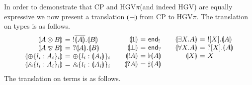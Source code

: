 \documentclass{easychair}
\makeatletter
\newcommand{\ba}{\begin{array}}
\newcommand{\ea}{\end{array}}
\newenvironment{eqs}{\ba{@{}r@{~}c@{~}l@{}}}{\ea}
\newcommand{\key}{\mathsf}
\newcommand{\set}[1]{\{ #1 \}}
\newcommand{\cptogv}[1]{\llparenthesis{#1}\rrparenthesis}
\newcommand{\row}[2]{\set{#1}_{#2}}
\newcommand{\gvOutput}[2]{\mathord{!}{#1}.{#2}}
\newcommand{\gvInput}[2]{\mathord{?}{#1}.{#2}}
\newcommand{\gvEndOutput}{\key{end}_!}
\newcommand{\gvEndInput}{\key{end}_?}
\newcommand{\gvPlus}[2]{\oplus \row{#1}{#2}}
\newcommand{\gvChoice}[2]{\binampersand \row{#1}{#2}}
\newcommand{\gvServer}[1]{\flat {#1}}
\newcommand{\gvService}[1]{\sharp {#1}}
\newcommand{\gvDual}[1]{\overline{#1}}
\newcommand{\gvOutputType}[2]{![{#1}].{#2}}
\newcommand{\gvInputType}[2]{?[{#1}].{#2}}
\newcommand{\la}{l}
\newcommand{\cpTimes}[2]{{#1} \otimes {#2}}
\newcommand{\cpPar}[2]{{#1} \mathbin{\bindnasrepma} {#2}}
\newcommand{\cpPlus}[2]{\oplus \row{#1}{#2}}
\newcommand{\cpWith}[2]{\binampersand \row{#1}{#2}}
\newcommand{\cpOne}{1}
\newcommand{\cpBottom}{\bot}
\newcommand{\cpOfCourse}[1]{!{#1}}
\newcommand{\cpWhyNot}[1]{?{#1}}
\newcommand{\cpExists}[2]{\exists {#1}.{#2}}
\newcommand{\cpForall}[2]{\forall {#1}.{#2}}
\newcommand{\hgv}{HGV\xspace}
\newcommand{\hgvpi}{HGV$\pi$\xspace}
\makeatother
\begin{document}
In order to demonstrate that CP and \hgvpi (and indeed \hgv) are equally expressive we now present a
translation $\cptogv{-}$ from CP to \hgvpi. The translation on types is as follows.
\[
\ba{@{}c@{\qquad}c@{\qquad}c@{}}
\begin{eqs}
\cptogv{\cpTimes{A}{B}} &=& \gvOutput{\gvDual{\cptogv{A}}}{\cptogv{B}} \\
\cptogv{\cpPar{A}{B}}   &=& \gvInput{\cptogv{A}}{\cptogv{B}} \\
\cptogv{\cpPlus{\la_i:A_i}{i}} &=& \gvPlus{\la_i:\cptogv{A_i}}{i}  \\
\cptogv{\cpWith{\la_i:A_i}{i}} &=& \gvChoice{\la_i:\cptogv{A_i}}{i} \\
\end{eqs}
&
\begin{eqs}
\cptogv{\cpOne}         &=& \gvEndOutput \\
\cptogv{\cpBottom}      &=& \gvEndInput \\
\cptogv{\cpOfCourse{A}} &=& \gvServer{\cptogv{A}} \\
\cptogv{\cpWhyNot{A}}   &=& \gvService{\cptogv{A}} \\
\end{eqs}
&
\begin{eqs}
\cptogv{\cpExists{X}{A}} &=& \gvOutputType{X}{\cptogv{A}} \\
\cptogv{\cpForall{X}{A}} &=& \gvInputType{X}{\cptogv{A}} \\
\cptogv{X}               &=& X \\
~ \\
\end{eqs}
\ea
\]
The translation on terms is as follows.
\end{document}
